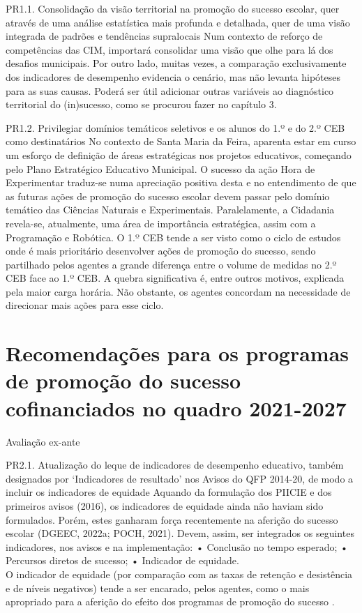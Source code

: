 \documentclass[
]{book}
\begin{document}
PR1.1. Consolidação da visão territorial na promoção do sucesso escolar, quer através de uma análise estatística mais profunda e detalhada, quer de uma visão integrada de padrões e tendências supralocais
Num contexto de reforço de competências das CIM, importará consolidar uma visão que olhe para lá dos desafios municipais. Por outro lado, muitas vezes, a comparação exclusivamente dos indicadores de desempenho evidencia o cenário, mas não levanta hipóteses para as suas causas. Poderá ser útil adicionar outras variáveis ao diagnóstico territorial do (in)sucesso, como se procurou fazer no capítulo 3.

PR1.2. Privilegiar domínios temáticos seletivos e os alunos do 1.º e do 2.º CEB como destinatários
No contexto de Santa Maria da Feira, aparenta estar em curso um esforço de definição de áreas estratégicas nos projetos educativos, começando pelo Plano Estratégico Educativo Municipal. O sucesso da ação Hora de Experimentar traduz-se numa apreciação positiva desta e no entendimento de que as futuras ações de promoção do sucesso escolar devem passar pelo domínio temático das Ciências Naturais e Experimentais. Paralelamente, a Cidadania revela-se, atualmente, uma área de importância estratégica, assim com a Programação e Robótica.
O 1.º CEB tende a ser visto como o ciclo de estudos onde é mais prioritário desenvolver ações de promoção do sucesso, sendo partilhado pelos agentes a grande diferença entre o volume de medidas no 2.º CEB face ao 1.º CEB. A quebra significativa é, entre outros motivos, explicada pela maior carga horária. Não obstante, os agentes concordam na necessidade de direcionar mais ações para esse ciclo.

\hypertarget{recomendauxe7uxf5es-para-os-programas-de-promouxe7uxe3o-do-sucesso-cofinanciados-no-quadro-2021-2027}{%
\section{\texorpdfstring{\textbf{Recomendações para os programas de promoção do sucesso cofinanciados no quadro 2021-2027}}{Recomendações para os programas de promoção do sucesso cofinanciados no quadro 2021-2027}}\label{recomendauxe7uxf5es-para-os-programas-de-promouxe7uxe3o-do-sucesso-cofinanciados-no-quadro-2021-2027}}

Avaliação ex-ante

PR2.1. Atualização do leque de indicadores de desempenho educativo, também designados por `Indicadores de resultado' nos Avisos do QFP 2014-20, de modo a incluir os indicadores de equidade
Aquando da formulação dos PIICIE e dos primeiros avisos (2016), os indicadores de equidade ainda não haviam sido formulados. Porém, estes ganharam força recentemente na aferição do sucesso escolar (DGEEC, 2022a; POCH, 2021). Devem, assim, ser integrados os seguintes indicadores, nos avisos e na implementação:
• Conclusão no tempo esperado;
• Percursos diretos de sucesso;
• Indicador de equidade.\\
O indicador de equidade (por comparação com as taxas de retenção e desistência e de níveis negativos) tende a ser encarado, pelos agentes, como o mais apropriado para a aferição do efeito dos programas de promoção do sucesso .
\end{document}
